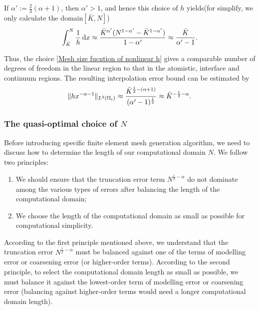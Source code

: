 If $\alpha':=\frac{2}{3}(\alpha+1)$, then $\alpha'>1$, and hence this choice of $h$ yields(for simplify, we only calculate the domain$[\bar{K},N]$)
\begin{equation}\label{int of nonlinear h}
	\int_{\bar{K}}^{N} \frac{1}{h} \,\text{d} x \approx \frac{\bar{K}^{\alpha'}(N^{1-\alpha'}-\bar{K}^{1-\alpha'})}{1-\alpha'}\approx \frac{\bar{K}}{\alpha'-1}.
\end{equation}

Thus, the choice \eqref{Mesh size fucntion of nonlinear h} gives a comparable number of degrees of freedom in the linear region to that in the atomistic, interface and continuum regions. The resulting interpolation error bound can be estimated by
\begin{equation}\label{Decay of the nonlinear best approximation term}
	\Vert h x^{-\alpha-1}\Vert_{L^{2}(\Omega_{{\rm c}})} \approx \frac{\bar{K}^{\frac{1}{2}-(\alpha+1)}}{(\alpha'-1)^{\frac{1}{2}}} \approx \bar{K}^{-\frac{1}{2}-\alpha}.
\end{equation}



\subsubsection{The quasi-optimal choice of $N$}
\label{sec: choice_of_N_cg}

Before introducing specific finite element mesh generation algorithm, we need to discuss how to determine the length of our computational domain $N$. We follow two principles:
\begin{enumerate}
	\item We should ensure that the truncation error term $N^{\frac{1}{2}-\alpha}$ do not dominate among the various types of errors after balancing the length of the computational domain;
	
	\item We choose the length of the computational domain as small as possible for computational simplicity.
\end{enumerate}

According to the first principle mentioned above, we understand that the truncation error $N^{\frac{1}{2}-\alpha}$ must be balanced against one of the terms of modelling error or coarsening error (or higher-order terms). According to the second principle, to select the computational domain length as small as possible, we must balance it against the lowest-order term of modelling error or coarsening error (balancing against higher-order terms would need a longer computational domain length).


